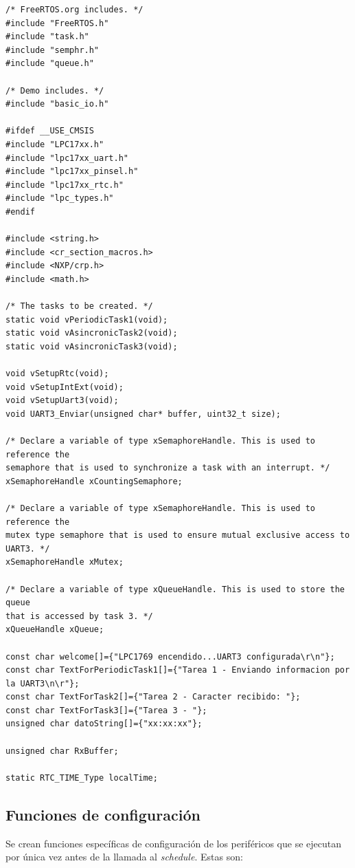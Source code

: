 \documentclass[a4paper,12pt]{article}
\begin{document}
\begin{verbatim}
/* FreeRTOS.org includes. */
#include "FreeRTOS.h"
#include "task.h"
#include "semphr.h"
#include "queue.h"

/* Demo includes. */
#include "basic_io.h"

#ifdef __USE_CMSIS
#include "LPC17xx.h"
#include "lpc17xx_uart.h"
#include "lpc17xx_pinsel.h"
#include "lpc17xx_rtc.h"
#include "lpc_types.h"
#endif

#include <string.h>
#include <cr_section_macros.h>
#include <NXP/crp.h>
#include <math.h>

/* The tasks to be created. */
static void vPeriodicTask1(void);
static void vAsincronicTask2(void);
static void vAsincronicTask3(void);

void vSetupRtc(void);
void vSetupIntExt(void);
void vSetupUart3(void);
void UART3_Enviar(unsigned char* buffer, uint32_t size);

/* Declare a variable of type xSemaphoreHandle. This is used to reference the
semaphore that is used to synchronize a task with an interrupt. */
xSemaphoreHandle xCountingSemaphore;

/* Declare a variable of type xSemaphoreHandle. This is used to reference the
mutex type semaphore that is used to ensure mutual exclusive access to UART3. */
xSemaphoreHandle xMutex;

/* Declare a variable of type xQueueHandle. This is used to store the queue
that is accessed by task 3. */
xQueueHandle xQueue;

const char welcome[]={"LPC1769 encendido...UART3 configurada\r\n"};
const char TextForPeriodicTask1[]={"Tarea 1 - Enviando informacion por la UART3\n\r"};
const char TextForTask2[]={"Tarea 2 - Caracter recibido: "};
const char TextForTask3[]={"Tarea 3 - "};
unsigned char datoString[]={"xx:xx:xx"};

unsigned char RxBuffer;

static RTC_TIME_Type localTime;
\end{verbatim}

\subsection{Funciones de configuración}

Se crean funciones específicas de configuración de los periféricos que se ejecutan por única vez antes de la llamada al \textit{schedule}.  Estas son:
\end{document}
